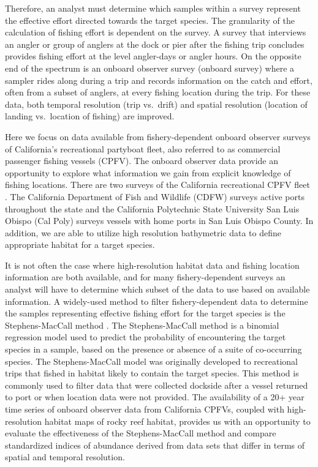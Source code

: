 \documentclass[
  12pt,
  authoryear,
  preprint,
  3p]{elsarticle}
\begin{document}
Therefore, an analyst must determine which samples within a survey
represent the effective effort directed towards the target species. The
granularity of the calculation of fishing effort is dependent on the
survey. A survey that interviews an angler or group of anglers at the
dock or pier after the fishing trip concludes provides fishing effort at
the level angler-days or angler hours. On the opposite end of the
spectrum is an onboard observer survey (onboard survey) where a sampler
rides along during a trip and records information on the catch and
effort, often from a subset of anglers, at every fishing location during
the trip. For these data, both temporal resolution (trip vs.~drift) and
spatial resolution (location of landing vs.~location of fishing) are
improved.

Here we focus on data available from fishery-dependent onboard observer
surveys of California's recreational partyboat fleet, also referred to
as commercial passenger fishing vessels (CPFV). The onboard observer
data provide an opportunity to explore what information we gain from
explicit knowledge of fishing locations. There are two surveys of the
California recreational CPFV fleet \citep{Monk:2014:DRD}. The California
Department of Fish and Wildlife (CDFW) surveys active ports throughout
the state and the California Polytechnic State University San Luis
Obispo (Cal Poly) surveys vessels with home ports in San Luis Obispo
County. In addition, we are able to utilize high resolution bathymetric
data to define appropriate habitat for a target species.

It is not often the case where high-resolution habitat data and fishing
location information are both available, and for many fishery-dependent
surveys an analyst will have to determine which subset of the data to
use based on available information. A widely-used method to filter
fishery-dependent data to determine the samples representing effective
fishing effort for the target species is the Stephens-MacCall method
\citeyearpar{Stephens:2004:MAS}. The Stephens-MacCall method is a
binomial regression model used to predict the probability of
encountering the target species in a sample, based on the presence or
absence of a suite of co-occurring species. The Stephens-MacCall model
was originally developed to recreational trips that fished in habitat
likely to contain the target species. This method is commonly used to
filter data that were collected dockside after a vessel returned to port
or when location data were not provided. The availability of a 20+ year
time series of onboard observer data from California CPFVs, coupled with
high-resolution habitat maps of rocky reef habitat, provides us with an
opportunity to evaluate the effectiveness of the Stephens-MacCall method
and compare standardized indices of abundance derived from data sets
that differ in terms of spatial and temporal resolution.
\end{document}
